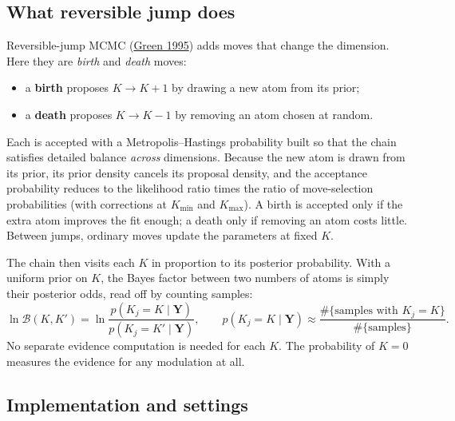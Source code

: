 \documentclass[11pt,a4paper]{article}
\begin{document}
\subsection{What reversible jump does}

Reversible-jump MCMC (\href{https://doi.org/10.1093/biomet/82.4.711}{Green 1995})
adds moves that change the dimension. Here they are \emph{birth} and \emph{death}
moves:
\begin{itemize}
  \item a \textbf{birth} proposes $K\to K+1$ by drawing a new atom from its prior;
  \item a \textbf{death} proposes $K\to K-1$ by removing an atom chosen at random.
\end{itemize}
Each is accepted with a Metropolis--Hastings probability built so that the chain
satisfies detailed balance \emph{across} dimensions. Because the new atom is drawn from
its prior, its prior density cancels its proposal density, and the acceptance
probability reduces to the likelihood ratio times the ratio of move-selection
probabilities (with corrections at $K_{\min}$ and $K_{\max}$). A birth is accepted only
if the extra atom improves the fit enough; a death only if removing an atom costs
little. Between jumps, ordinary moves update the parameters at fixed $K$.

The chain then visits each $K$ in proportion to its posterior probability. With a
uniform prior on $K$, the Bayes factor between two numbers of atoms is simply their
posterior odds, read off by counting samples:
\begin{equation}
  \ln\mathcal B(K,K') = \ln\frac{p(K_j=K\mid\boldsymbol Y)}{p(K_j=K'\mid\boldsymbol Y)},\qquad
  p(K_j=K\mid\boldsymbol Y)\approx\frac{\#\{\text{samples with }K_j=K\}}{\#\{\text{samples}\}}.
\end{equation}
No separate evidence computation is needed for each $K$. The probability of $K=0$
measures the evidence for any modulation at all.

\subsection{Implementation and settings}
\end{document}
